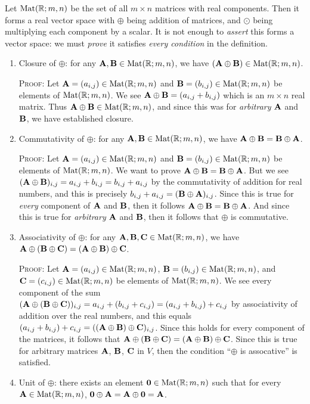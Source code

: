 \begin{example}
Let $\mathrm{Mat}(\mathbb{R};m,n)$ be the set of all $m\times n$ matrices with real components.
Then it forms a real vector space with $\oplus$ being addition of
matrices, and $\odot$ being multiplying each component by a scalar.
It is not enough to \emph{assert} this forms a vector space: we must
\emph{prove} it satisfies \emph{every condition} in the definition.
\begin{enumerate}[label=(\arabic*)]
\item Closure of $\oplus$: for any $\mathbf{A},\mathbf{B}\in\mathrm{Mat}(\mathbb{R};m,n)$, we
  have $(\mathbf{A}\oplus\mathbf{B})\in\mathrm{Mat}(\mathbb{R};m,n)$.

  \textsc{Proof:} Let $\mathbf{A}=(a_{i,j})\in\mathrm{Mat}(\mathbb{R};m,n)$ and
  $\mathbf{B}=(b_{i,j})\in\mathrm{Mat}(\mathbb{R};m,n)$ be elements of $\mathrm{Mat}(\mathbb{R};m,n)$.
  We see $\mathbf{A}\oplus\mathbf{B}=(a_{i,j}+b_{i,j})$ which is an $m\times n$
  real matrix. Thus $\mathbf{A}\oplus\mathbf{B}\in\mathrm{Mat}(\mathbb{R};m,n)$, and since
  this was for \emph{arbitrary} $\mathbf{A}$ and $\mathbf{B}$, we have
  established closure.
\item Commutativity of $\oplus$: for any $\mathbf{A},\mathbf{B}\in\mathrm{Mat}(\mathbb{R};m,n)$,
  we have $\mathbf{A}\oplus\mathbf{B}=\mathbf{B}\oplus\mathbf{A}$.
  
  \textsc{Proof:} Let $\mathbf{A}=(a_{i,j})\in\mathrm{Mat}(\mathbb{R};m,n)$ and
  $\mathbf{B}=(b_{i,j})\in\mathrm{Mat}(\mathbb{R};m,n)$ be elements of $\mathrm{Mat}(\mathbb{R};m,n)$.
  We want to prove $\mathbf{A}\oplus\mathbf{B}=\mathbf{B}\oplus\mathbf{A}$.
  But we see $(\mathbf{A}\oplus\mathbf{B})_{i,j} = a_{i,j}+b_{i,j} = b_{i,j}+a_{i,j}$
  by the commutativity of addition for real numbers, and this is
  precisely
  $b_{i,j}+a_{i,j} = (\mathbf{B}\oplus\mathbf{A})_{i,j}$. Since this is true
  for \emph{every} component of $\mathbf{A}$ and $\mathbf{B}$, then it follows
  $\mathbf{A}\oplus\mathbf{B}=\mathbf{B}\oplus\mathbf{A}$.
  And since this is true for \emph{arbitrary} $\mathbf{A}$ and
  $\mathbf{B}$, then it follows that $\oplus$ is commutative.
\item Associativity of $\oplus$: for any
  $\mathbf{A},\mathbf{B},\mathbf{C}\in\mathrm{Mat}(\mathbb{R};m,n)$, we have $\mathbf{A}\oplus(\mathbf{B}\oplus\mathbf{C})=(\mathbf{A}\oplus\mathbf{B})\oplus\mathbf{C}$.

  \textsc{Proof:} 
Let $\mathbf{A}=(a_{i,j})\in\mathrm{Mat}(\mathbb{R};m,n)$,
  $\mathbf{B}=(b_{i,j})\in\mathrm{Mat}(\mathbb{R};m,n)$, and
  $\mathbf{C}=(c_{i,j})\in\mathrm{Mat}(\mathbb{R};m,n)$ be elements of $\mathrm{Mat}(\mathbb{R};m,n)$.
  We see every component of the sum $(\mathbf{A}\oplus(\mathbf{B}\oplus\mathbf{C}))_{i,j} = a_{i,j} + (b_{i,j}+c_{i,j}) = (a_{i,j} + b_{i,j})+c_{i,j}$
  by associativity of addition over the real numbers,
  and this equals $(a_{i,j} + b_{i,j})+c_{i,j} = ((\mathbf{A}\oplus\mathbf{B})\oplus\mathbf{C})_{i,j}$.
  Since this holds for every component of the matrices, it follows that
  $\mathbf{A}\oplus(\mathbf{B}\oplus\mathbf{C}) = (\mathbf{A}\oplus\mathbf{B})\oplus\mathbf{C}$.
  Since this is true for arbitrary matrices $\mathbf{A}$, $\mathbf{B}$,
  $\mathbf{C}$ in $V$, then the condition ``$\oplus$ is assocative'' is satisfied.
\item Unit of $\oplus$: there exists an element $\mathbf{0}\in\mathrm{Mat}(\mathbb{R};m,n)$ such that
  for every $\mathbf{A}\in\mathrm{Mat}(\mathbb{R};m,n)$,
  $\mathbf{0}\oplus\mathbf{A}=\mathbf{A}\oplus\mathbf{0}=\mathbf{A}$. 


\end{enumerate}
\end{example}
